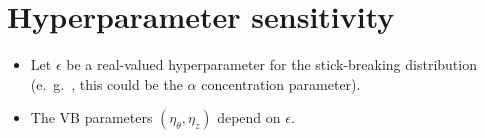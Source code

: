 \documentclass[a0,plainsections,30pt]{sciposter}\usepackage[]{graphicx}\usepackage[]{color}
\newcommand{\Expect}{\mathbb{E}}
\newcommand{\etazopt}{\eta_z^{*}}
\newcommand{\etathetaopt}{\eta_\theta^{*}}
\begin{document}
\begin{minipage}[t]{0.45\textwidth}
% 
% 
% 

\vspace{-0.6in}
\section*{Hyperparameter sensitivity}
\vspace{-0.3in}

\begin{itemize}

\item Let $\epsilon$ be a real-valued hyperparameter for the stick-breaking distribution
(e.\ g.\ , this could be the $\alpha$ concentration parameter). 

\item The VB parameters $(\eta_\theta, \eta_z)$ depend on $\epsilon$. 


\end{itemize}
\end{minipage}
\end{document}
